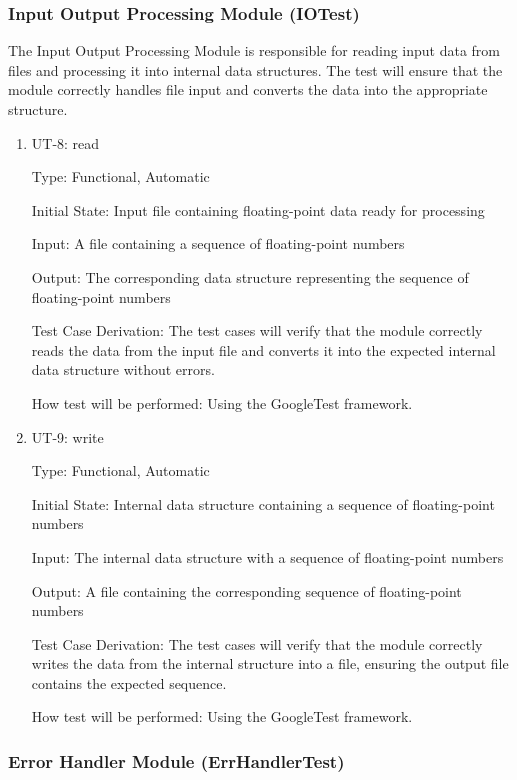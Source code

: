 \documentclass[12pt, titlepage]{article}
\begin{document}
\subsubsection{Input Output Processing Module (IOTest)}

The Input Output Processing Module is responsible for reading input data from
files and processing it into internal data structures. The test will ensure that
the module correctly handles file input and converts the data into the
appropriate structure.

\begin{enumerate}

\item{UT-8: read\\}

Type: Functional, Automatic
					
Initial State: Input file containing floating-point data ready for processing
					
Input: A file containing a sequence of floating-point numbers
					
Output: The corresponding data structure representing the sequence of
floating-point numbers

Test Case Derivation: The test cases will verify that the module correctly reads
the data from the input file and converts it into the expected internal data
structure without errors.

How test will be performed: Using the GoogleTest framework.

\item{UT-9: write\\}

Type: Functional, Automatic

Initial State: Internal data structure containing a sequence of floating-point
numbers

Input: The internal data structure with a sequence of floating-point numbers

Output: A file containing the corresponding sequence of floating-point numbers

Test Case Derivation: The test cases will verify that the module correctly
writes the data from the internal structure into a file, ensuring the output
file contains the expected sequence.

How test will be performed: Using the GoogleTest framework.
    
\end{enumerate}

\subsubsection{Error Handler Module (ErrHandlerTest)}
\end{document}
